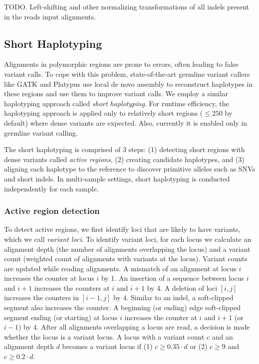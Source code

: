 \documentclass{article}
\begin{document}
TODO. Left-shifting and other normalizing transformations of all indels present in the reads input alignments.


\subsection{Short Haplotyping}

Alignments in polymorphic regions are prone to errors, often leading to false variant calls. To cope with this problem, state-of-the-art germline variant callers like GATK and Platypus use local de novo assembly to reconstruct haplotypes in these regions and use them to improve variant calls. We employ a similar haplotyping approach called {\em short haplotyping}. For runtime efficiency, the haplotyping approach is applied only to relatively short regions ($\leq 250$ by default) where dense variants are expected. Also, currently it is enabled only in germline variant calling.

The short haplotyping is comprised of 3 steps: (1) detecting short regions with dense variants called {\em active regions}, (2) creating candidate haplotypes, and (3) aligning each haplotype to the reference to discover primitive alleles such as SNVs and short indels. In multi-sample settings, short haplotyping is conducted independently for each sample.

\subsubsection{Active region detection}
To detect active regions, we first identify loci that are likely to have variants, which we call {\em variant loci}. To identify variant loci, for each locus we calculate an alignment depth (the number of alignments overlapping the locus) and a variant count (weighted count of alignments with variants at the locus). Variant counts are updated while reading alignments. A mismatch of an alignment at locus $i$ increases the counter at locus $i$ by 1. An insertion of a sequence between locus $i$ and $i+1$ increases the counters at $i$ and $i+1$ by 4. A deletion of loci $[i,j]$ increases the counters in $[i-1,j]$ by 4. Similar to an indel, a soft-clipped segment also increases the counter. A beginning (or ending) edge soft-clipped segment ending (or starting) at locus $i$ increases the counter at $i$ and $i+1$ (or $i-1$) by 4. After all alignments overlapping a locus are read, a decision is made whether the locus is a variant locus. A locus with a variant count $c$ and an alignment depth $d$ becomes a variant locus if (1) $c \geq 0.35 \cdot d$ or (2) $c \geq 9$ and $c \geq 0.2 \cdot d$.
\end{document}
